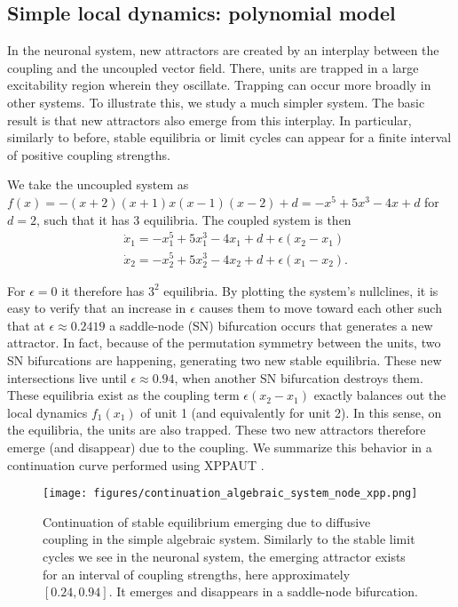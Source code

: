 \subsection*{Simple local dynamics: polynomial model}
In the neuronal system, new attractors are created by an interplay between the coupling and the uncoupled vector field. There, units are trapped in a large excitability region wherein they oscillate. Trapping can occur more broadly in other systems. To illustrate this, we study a much simpler system. The basic result is that new attractors also emerge from this interplay. In particular, similarly to before, stable equilibria or limit cycles can appear for a finite interval of positive coupling strengths.

We take the uncoupled system as $f(x) = -(x+2)(x+1)x(x-1)(x-2) + d = -x^5 + 5x^3 - 4x + d$ for $d = 2$, such that it has 3 equilibria. The coupled system is then
%
\begin{align}
    &\dot{x}_1 = -x_1^5 + 5x_1^3 - 4x_1 + d + \epsilon (x_2 - x_1)\\
    &\dot{x}_2 = -x_2^5 + 5x_2^3 - 4x_2 + d + \epsilon (x_1 - x_2).
\end{align}

For $\epsilon=0$ it therefore has $3^2$ equilibria. By plotting the system's nullclines, it is easy to verify that an increase in $\epsilon$ causes them to move toward each other such that at $\epsilon\approx 0.2419$ a saddle-node (SN) bifurcation occurs that generates a new attractor. In fact, because of the permutation symmetry between the units, two SN bifurcations are happening, generating two new stable equilibria. These new intersections live until $\epsilon \approx 0.94$, when another SN bifurcation destroys them. These equilibria exist as the coupling term $\epsilon(x_2-x_1)$ exactly balances out the local dynamics $f_1(x_1)$ of unit 1 (and equivalently for unit 2). In this sense, on the equilibria, the units are also trapped. These two new attractors therefore emerge (and disappear) due to the coupling. 
We summarize this behavior in a continuation curve performed using XPPAUT \cite{ermentrout2002simulating}.
%
\begin{figure}[h!]
    \centering
    \texttt{[image: figures/continuation\_algebraic\_system\_node\_xpp.png]}
    \caption{Continuation of stable equilibrium emerging due to diffusive coupling in the simple algebraic system. Similarly to the stable limit cycles we see in the neuronal system, the emerging attractor exists for an interval of coupling strengths, here approximately $[0.24, 0.94]$. It emerges and disappears in a saddle-node bifurcation. }
    \label{fig:cont-lc-rotated-shifted}
\end{figure}

